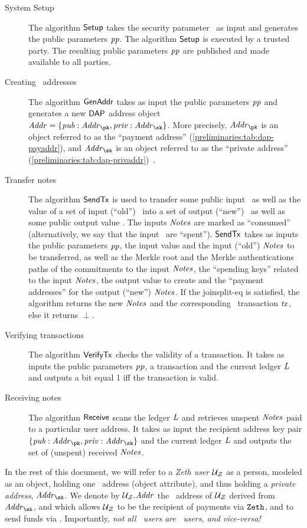 \begin{description}
    \item[System Setup] The algorithm $\mathsf{Setup}$ takes the security parameter \secpar~as input and generates the public parameters $\mathit{pp}$. The algorithm $\mathsf{Setup}$ is executed by a trusted party. The resulting public parameters $\mathit{pp}$ are published and made available to all parties.
    \item[Creating \zeth~addresses] The algorithm $\mathsf{GenAddr}$ takes as input the public parameters $\mathit{pp}$ and generates a new $\mathsf{DAP}$ address object $\addr = \{\pubaddr: \addr_\pk, \privaddr: \addr_\sk\}$. More precisely, $\addr_\pk$ is an object referred to as the ``payment address'' (\cref{preliminaries:tab:dap-payaddr}), and $\addr_\sk$ is an object referred to as the ``private address'' (\cref{preliminaries:tab:dap-privaddr})~\cite{zcashprotocol}.
    \item[Transfer notes] The algorithm $\mathsf{SendTx}$ is used to transfer some public input \vin~as well as the value of a set of input (``old'') \notes~into a set of output (``new'') \notes~as well as some public output value \vout. The inputs $\mathit{Notes}$ are marked as ``consumed'' (alternatively, we say that the input \notes~are ``spent''). $\mathsf{SendTx}$ takes as inputs the public parameters $\mathit{pp}$, the input value and the input (``old'') $\mathit{Notes}$ to be transferred, as well as the Merkle root and the Merkle authentications paths of the commitments to the input $\mathit{Notes}$, the ``spending keys'' related to the input $\mathit{Notes}$, the output value to create and the ``payment addresses'' for the output (``new'') $\mathit{Notes}$. If the \gls{joinsplit-eq} is satisfied, the algorithm returns the new $\mathit{Notes}$ and the corresponding \ethereum~transaction $\mathit{tx}$, else it returns $\perp$.
    \item[Verifying transactions] The algorithm $\mathsf{VerifyTx}$ checks the validity of a transaction. It takes as inputs the public parameters $\mathit{pp}$, a transaction and the current ledger $\mathit{L}$ and outputs a bit equal 1 iff the transaction is valid.
    \item[Receiving notes] The algorithm $\mathsf{Receive}$ scans the ledger $\mathit{L}$ and retrieves unspent $\mathit{Notes}$ paid to a particular user address. It takes as input the recipient address key pair $\{\pubaddr: \addr_\pk, \privaddr: \addr_\sk\}$ and the current ledger $\mathit{L}$ and outputs the set of (unspent) received $\mathit{Notes}$.
\end{description}

\begin{notebox}
    In the rest of this document, we will refer to a \emph{Zeth user} $\mathcal{{U}_{Z}}$ as a person, modeled as an object, holding one \zeth~address (object attribute), and thus holding a \emph{private address}, $\addr_\sk$. We denote by $\mathcal{{U}_{Z}}.\mathit{Addr}$ the \zeth~address of $\mathcal{{U}_{Z}}$ derived from $\addr_\sk$, and which allows $\mathcal{{U}_{Z}}$ to be the recipient of payments via $\texttt{Zeth}$, and to send funds via \zeth. Importantly, \emph{not all \ethereum~users are \zeth~users, and vice-versa!}
\end{notebox}

